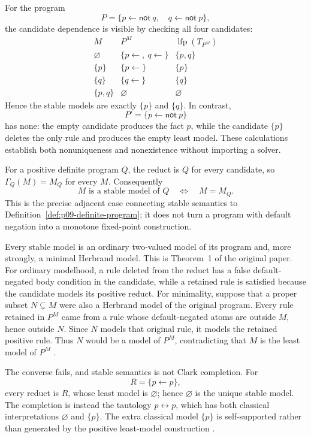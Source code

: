For the program
\[
 P=\{p\leftarrow\mathsf{not}\ q,\quad
     q\leftarrow\mathsf{not}\ p\},
\]
the candidate dependence is visible by checking all four candidates:
\[
\begin{array}{c|c|c}
M&P^M&\operatorname{lfp}(T_{P^M})\\
\hline
\varnothing&\{p\leftarrow,\ q\leftarrow\}&\{p,q\}\\
\{p\}&\{p\leftarrow\}&\{p\}\\
\{q\}&\{q\leftarrow\}&\{q\}\\
\{p,q\}&\varnothing&\varnothing
\end{array}
\]
Hence the stable models are exactly \(\{p\}\) and \(\{q\}\).  In contrast,
\[
 P'=\{p\leftarrow\mathsf{not}\ p\}
\]
has none: the empty candidate produces the fact \(p\), while the candidate
\(\{p\}\) deletes the only rule and produces the empty least model.  These
calculations establish both nonuniqueness and nonexistence without importing a
solver.

For a positive definite program \(Q\), the reduct is \(Q\) for every candidate,
so \(\Gamma_Q(M)=M_Q\) for every \(M\).  Consequently
\[
 M\text{ is a stable model of }Q
 \quad\Longleftrightarrow\quad M=M_Q.
\]
This is the precise adjacent case connecting stable semantics to
Definition~\ref{def:p09-definite-program}; it does not turn a program with
default negation into a monotone fixed-point construction.

Every stable model is an ordinary two-valued model of its program and, more
strongly, a minimal Herbrand model.  This is Theorem~1 of the original paper.
For ordinary modelhood, a rule deleted from the reduct has a false
default-negated body condition in the candidate, while a retained rule is
satisfied because the candidate models its positive reduct.  For minimality,
suppose that a proper subset \(N\subsetneq M\) were also a Herbrand model of
the original program.  Every rule retained in \(P^M\) came from a rule whose
default-negated atoms are outside \(M\), hence outside \(N\).  Since \(N\)
models that original rule, it models the retained positive rule.  Thus \(N\)
would be a model of \(P^M\), contradicting that \(M\) is the least model of
\(P^M\) \cite[\S2, thm.~1]{GelfondLifschitz1988}.

The converse fails, and stable semantics is not Clark completion.  For
\[
 R=\{p\leftarrow p\},
\]
every reduct is \(R\), whose least model is \(\varnothing\); hence
\(\varnothing\) is the unique stable model.  The completion is instead the
tautology \(p\leftrightarrow p\), which has both classical interpretations
\(\varnothing\) and \(\{p\}\).  The extra classical model \(\{p\}\) is
self-supported rather than generated by the positive least-model construction
\cite{GelfondLifschitz1988}.

